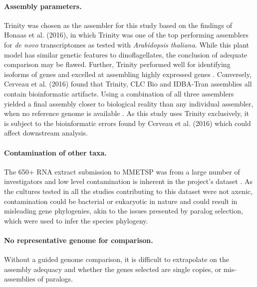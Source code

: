 \documentclass[12pt]{article}
\begin{document}
\paragraph*{Assembly parameters.}
Trinity was chosen as the assembler for this study based on the findings of Honaas et al. (2016), in which Trinity was one of the top performing assemblers for \textit{de novo} transcriptomes as tested with \textit{Arabidopsis thaliana}. 
While this plant model has similar genetic features to dinoflagellates, the conclusion of adequate comparison may be flawed.
Further, Trinity performed well for identifying isoforms of genes and excelled at assembling highly expressed genes \cite{honaas2016selecting}.
Conversely, Cerveau et al. (2016) found that Trinity, CLC Bio and IDBA-Tran assemblies all contain bioinformatic artifacts. 
Using a combination of all three assemblers yielded a final assembly closer to biological reality than any individual assembler, when no reference genome is available \cite{cerveau2016combining}.
As this study uses Trinity exclusively, it is subject to the bioinformatic errors found by Cerveau et al. (2016) which could affect downstream analysis.
\paragraph*{Contamination of other taxa.} 
The 650+ RNA extract submission to MMETSP was from a large number of investigators and low level contamination is inherent in the project's dataset \cite{keeling2014marine}. 
As the cultures tested in all the studies contributing to this dataset were not axenic, contamination could be bacterial or eukaryotic in nature and could result in misleading gene phylogenies, akin to the issues presented by paralog selection, which were used to infer the species phylogeny.
\paragraph*{No representative genome for comparison.} 
Without a guided genome comparison, it is difficult to extrapolate on the assembly adequacy and whether the genes selected are single copies, or  mis-assemblies of paralogs.
\end{document}
